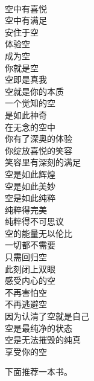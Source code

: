 \begin{poem}[空的纯粹]
    \begin{multicols}{4}
        \begin{center}~\\
            空中有喜悦 \\ 空中有满足 \\ 安住于空 \\ 体验空 \\ 成为空 \\ 你就是空 \\ 空即是真我 \\ 空就是你的本质 \\ 一个觉知的空 \\ 是如此神奇 \\ 在无念的空中 \\ 你有了深奥的体验 \\ 你绽放喜悦的笑容 \\ 笑容里有深刻的满足 \\ 空是如此辉煌 \\ 空是如此美妙 \\ 空是如此纯粹 \\ 纯粹得完美 \\ 纯粹得不可思议 \\ 空的能量无以伦比 \\ 一切都不需要 \\ 只需回归空 \\ 此刻闭上双眼 \\ 感受内心的空 \\ 不再害怕空 \\ 不再逃避空 \\ 因为认清了空就是自己 \\ 空是最纯净的状态 \\ 空是无法摧毁的纯真 \\ 享受你的空
        \end{center}
    \end{multicols}
\end{poem}

下面推荐一本书。

